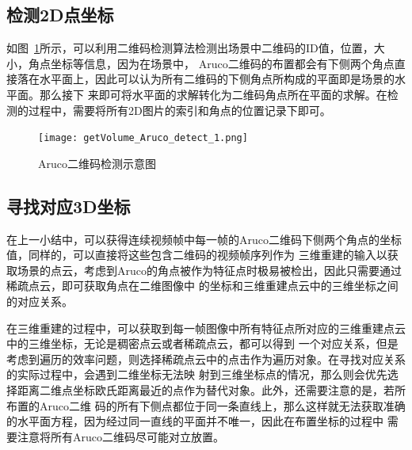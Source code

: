 \subsection{检测2D点坐标}
\label{sec:4.2.1}
如图~\ref{fig:getVolume_Aruco_detect}所示，可以利用二维码检测算法检测出场景中二维码的ID值，位置，大小，角点坐标等信息，因为在场景中，
Aruco二维码的布置都会有下侧两个角点直接落在水平面上，因此可以认为所有二维码的下侧角点所构成的平面即是场景的水平面。那么接下
来即可将水平面的求解转化为二维码角点所在平面的求解。在检测的过程中，需要将所有2D图片的索引和角点的位置记录下即可。

\begin{figure}[H] %
\centering
\texttt{[image: getVolume\_Aruco\_detect\_1.png]}
\caption{Aruco二维码检测示意图}
\label{fig:getVolume_Aruco_detect}
\end{figure}

\subsection{寻找对应3D坐标}
\label{sec:4.2.2}
在上一小结中，可以获得连续视频帧中每一帧的Aruco二维码下侧两个角点的坐标值，同样的，可以直接将这些包含二维码的视频帧序列作为
三维重建的输入以获取场景的点云，考虑到Aruco的角点被作为特征点时极易被检出，因此只需要通过稀疏点云，即可获取角点在二维图像中
的坐标和三维重建点云中的三维坐标之间的对应关系。

在三维重建的过程中，可以获取到每一帧图像中所有特征点所对应的三维重建点云中的三维坐标，无论是稠密点云或者稀疏点云，都可以得到
一个对应关系，但是考虑到遍历的效率问题，则选择稀疏点云中的点击作为遍历对象。在寻找对应关系的实际过程中，会遇到二维坐标无法映
射到三维坐标点的情况，那么则会优先选择距离二维点坐标欧氏距离最近的点作为替代对象。此外，还需要注意的是，若所布置的Aruco二维
码的所有下侧点都位于同一条直线上，那么这样就无法获取准确的水平面方程，因为经过同一直线的平面并不唯一，因此在布置坐标的过程中
需要注意将所有Aruco二维码尽可能对立放置。
